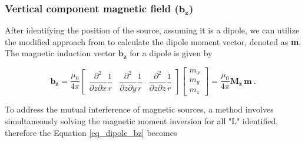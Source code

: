 \subsubsection{Vertical component magnetic field ($\mathbf{b_z}$)}\label{section_bz}
After identifying the position of the source, assuming it is a dipole, we can utilize the modified approach from \citet{Oliveira2015Estimation} to calculate the dipole moment vector, denoted as 
\textbf{m}. The magnetic induction vector $\mathbf{b_z}$ for a dipole is given by

\begin{equation}
\label{eq_dipole_bz}
\mathbf{b_z}
= \dfrac{\mu_0}{4\pi}
\begin{bmatrix}
\dfrac{\partial^2}{\partial z \partial x} \dfrac{1}{r}
& \dfrac{\partial^2}{\partial z \partial y} \dfrac{1}{r}
& \dfrac{\partial^2}{\partial z \partial z} \dfrac{1}{r}
\end{bmatrix}
\begin{bmatrix}
m_x \\ m_y \\ m_z
\end{bmatrix}
= \dfrac{\mu_0}{4\pi} \mathbf{M_z}\,\mathbf{m}
\ .
\end{equation}

To address the mutual interference of magnetic sources, a method involves simultaneously solving the magnetic moment inversion for all "L" identified, therefore the Equation \ref{eq_dipole_bz} becomes



